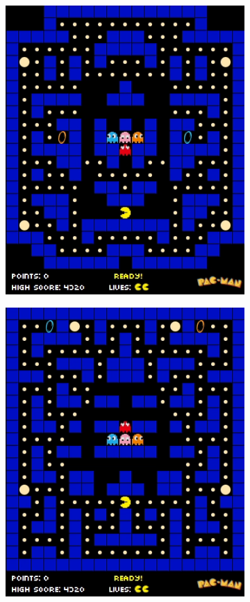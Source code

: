\documentclass[12pt,a4paper]{report}
\begin{document}
\begin{figure}[hb!]
\begin{subfigure}{.32\textwidth}
  \centering
  \includegraphics[width=.95\linewidth]{maze2}
  \caption{}
  \label{fig:snap1}
\end{subfigure}%
\begin{subfigure}{.32\textwidth}
  \centering
  \includegraphics[width=.95\linewidth]{maze3}

\end{subfigure}
\end{figure}
\end{document}
